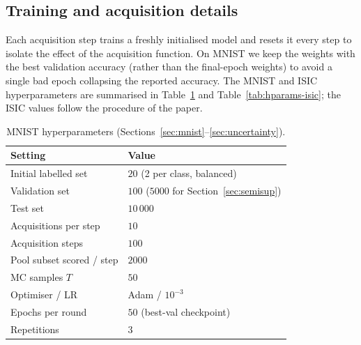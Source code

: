 \documentclass[11pt]{article}
\begin{document}
\subsection{Training and acquisition details}
Each acquisition step trains a freshly initialised model and resets it every
step to isolate the effect of the acquisition function. On MNIST we keep the
weights with the best validation accuracy (rather than the final-epoch weights)
to avoid a single bad epoch collapsing the reported accuracy. The MNIST and ISIC
hyperparameters are summarised in Table~\ref{tab:hparams-mnist} and
Table~\ref{tab:hparams-isic}; the ISIC values follow the procedure of the paper.

\begin{table}[h]
  \centering
  \caption{MNIST hyperparameters (Sections~\ref{sec:mnist}--\ref{sec:uncertainty}).}
  \label{tab:hparams-mnist}
  \begin{tabular}{ll}
    \toprule
    Setting & Value\\
    \midrule
    Initial labelled set         & $20$ (2 per class, balanced)\\
    Validation set               & $100$ ($5000$ for Section~\ref{sec:semisup})\\
    Test set                     & $10\,000$\\
    Acquisitions per step        & $10$\\
    Acquisition steps            & $100$\\
    Pool subset scored / step    & $2000$\\
    MC samples $T$               & $50$\\
    Optimiser / LR               & Adam / $10^{-3}$\\
    Epochs per round             & $50$ (best-val checkpoint)\\
    Repetitions                  & $3$\\
    \bottomrule
  \end{tabular}
\end{table}
\end{document}
